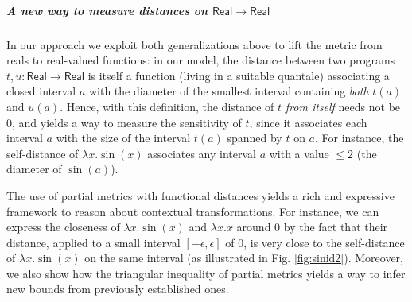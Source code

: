 \subparagraph*{A new way to measure distances on $\mathsf{Real}\to\mathsf{Real}$}
In our approach we exploit both generalizations above to lift the metric from reals to real-valued functions: in our model, 
the distance between  two programs $t,u:\mathsf{Real}\to \mathsf{Real}$ is itself a function (living in a suitable quantale)  associating a closed interval $a$ with the diameter of the smallest interval containing \emph{both} $t(a)$ and $u(a)$. 
Hence, with this definition,  the distance of $t$ \emph{from itself} needs not be 0, and yields a way to measure the sensitivity of $t$, since it associates each interval $a$ with the size of the interval $t(a)$ spanned by $t$ on $a$. For instance, the self-distance of $\lambda x.\sin(x)$ associates any interval $a$ with a value $\leq 2$ (the diameter of $\sin(a)$).





The use of partial metrics with functional distances yields a rich and expressive framework to reason about  
contextual transformations. For instance, we can express the closeness of $\lambda x.\sin(x)$ and $\lambda x.x$ around 0 by the fact that their distance, applied to a small interval $[-\epsilon,\epsilon]$ of 0, is very close to the {self-distance} of
$\lambda x.\sin(x)$ on the same interval (as illustrated in Fig. \ref{fig:sinid2}). Moreover, we also show how the triangular inequality of partial metrics yields a way to infer new bounds from previously established ones.

%

